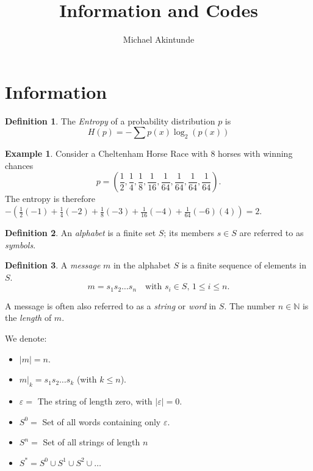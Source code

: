 \documentclass[a4paper]{article}
\theoremstyle{definition} \newtheorem*{definition}{Definition}
\newtheorem*{exmp}{Example} \newtheorem*{exmps}{Examples}
\newcommand{\naturals}{\mathbb{N}} \newcommand{\complexes}{\mathbb{C}}
\begin{document}
\title{Information and Codes}
\author{Michael Akintunde}
\maketitle

\section{Information}
\begin{definition}
  The \emph{Entropy} of a probability distribution $p$ is
  \[
    H(p) = - \sum p(x)\log_2(p(x))
  \]
\end{definition}
\begin{exmp}
  Consider a Cheltenham Horse Race with 8 horses with winning chances
  \[
    p = \left(
    \frac{1}{2},\frac{1}{4},\frac{1}{8},\frac{1}{16},\frac{1}{64},
    \frac{1}{64},\frac{1}{64},\frac{1}{64}\right).
  \] 
  The entropy is therefore $-\left( \frac{1}{2}(-1) + \frac{1}{4}(-2) +
  \frac{1}{8} (-3) + \frac{1}{16} (-4) + \frac{1}{64}(-6)(4) \right) = 2$.
\end{exmp}

\begin{definition}
  An \emph{alphabet} is a finite set $S$; its members $s \in S$ are referred to
  as \emph{symbols}.
\end{definition}

\begin{definition}
  A \emph{message} $m$ in the alphabet $S$ is a finite sequence of 
  elements in $S$.
  \[
    m = s_1 s_2 \dots s_n \quad \text{with } s_i \in S,\,1 \leq i \leq n.
  \]

  A message is often also referred to as a \emph{string} or \emph{word}
  in $S$. The number $n \in \naturals$ is the \emph{length} of $m$.
\end{definition}

\begin{remark} We denote:
  \begin{itemize}
    \item 
      $|m| = n$.
    \item $m|_k = s_1s_2 \dots s_k$ (with $k \leq n$).
    \item $\varepsilon=$ The string of length zero, with $|\varepsilon| =
      0$.
    \item $S^0=$ Set of all words containing only $\varepsilon$.
    \item $S^n=$ Set of all strings of length $n$
    \item $S^*= S^0 \cup S^1 \cup S^2 \cup \dots$
  \end{itemize}
\end{remark}
\end{document}

